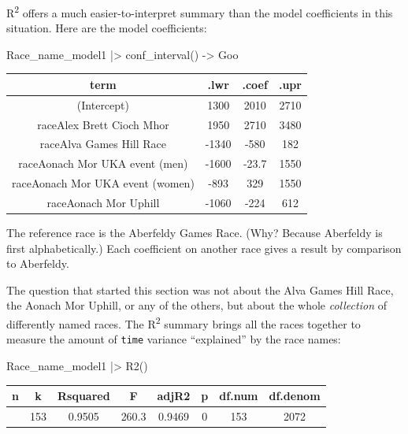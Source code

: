 \documentclass[
  letterpaper,
  DIV=11,
  numbers=noendperiod,
  oneside]{scrartcl}
\newenvironment{Shaded}{\begin{snugshade}}{\end{snugshade}}
\newcommand{\FunctionTok}[1]{\textcolor[rgb]{0.28,0.35,0.67}{#1}}
\newcommand{\NormalTok}[1]{\textcolor[rgb]{0.00,0.23,0.31}{#1}}
\newcommand{\OtherTok}[1]{\textcolor[rgb]{0.00,0.23,0.31}{#1}}
\newcommand{\SpecialCharTok}[1]{\textcolor[rgb]{0.37,0.37,0.37}{#1}}
\begin{document}
R\textsuperscript{2} offers a much easier-to-interpret summary than the
model coefficients in this situation. Here are the model coefficients:

\begin{Shaded}
\begin{Highlighting}[]
\NormalTok{Race\_name\_model1 }\SpecialCharTok{|\textgreater{}} \FunctionTok{conf\_interval}\NormalTok{() }\OtherTok{{-}\textgreater{}}\NormalTok{ Goo}
\end{Highlighting}
\end{Shaded}

\begin{longtable}[]{@{}cccc@{}}
\toprule\noalign{}
term & .lwr & .coef & .upr \\
\midrule\noalign{}
\endhead
\bottomrule\noalign{}
\endlastfoot
(Intercept) & 1300 & 2010 & 2710 \\
raceAlex Brett Cioch Mhor & 1950 & 2710 & 3480 \\
raceAlva Games Hill Race & -1340 & -580 & 182 \\
raceAonach Mor UKA event (men) & -1600 & -23.7 & 1550 \\
raceAonach Mor UKA event (women) & -893 & 329 & 1550 \\
raceAonach Mor Uphill & -1060 & -224 & 612 \\
\end{longtable}

The reference race is the Aberfeldy Games Race. (Why? Because Aberfeldy
is first alphabetically.) Each coefficient on another race gives a
result by comparison to Aberfeldy.

The question that started this section was not about the Alva Games Hill
Race, the Aonach Mor Uphill, or any of the others, but about the whole
\emph{collection} of differently named races. The R\textsuperscript{2}
summary brings all the races together to measure the amount of
\texttt{time} variance ``explained'' by the race names:

\begin{Shaded}
\begin{Highlighting}[]
\NormalTok{Race\_name\_model1 }\SpecialCharTok{|\textgreater{}} \FunctionTok{R2}\NormalTok{()}
\end{Highlighting}
\end{Shaded}

\begin{longtable}[]{@{}cccccccc@{}}
\toprule\noalign{}
n & k & Rsquared & F & adjR2 & p & df.num & df.denom \\
\midrule\noalign{}
\endhead
\bottomrule\noalign{}
\endlastfoot
2226 & 153 & 0.9505 & 260.3 & 0.9469 & 0 & 153 & 2072 \\
\end{longtable}
\end{document}

